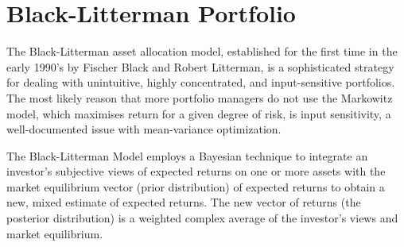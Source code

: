 %
%

%

\section{Black-Litterman Portfolio}
\label{sec:black-litterman}

The Black-Litterman asset allocation model, established for the first time in the early 1990’s by Fischer Black and Robert Litterman, is a sophisticated strategy for dealing with unintuitive, highly concentrated, and input-sensitive portfolios. The most likely reason that more portfolio managers do not use the Markowitz model, which maximises return for a given degree of risk, is input sensitivity, a well-documented issue with mean-variance optimization.

The Black-Litterman Model employs a Bayesian technique to integrate an investor’s subjective views of expected returns on one or more assets with the market equilibrium vector (prior distribution) of expected returns to obtain a new, mixed estimate of expected returns. The new vector of returns (the posterior distribution) is a weighted complex average of the investor’s views and market equilibrium.

